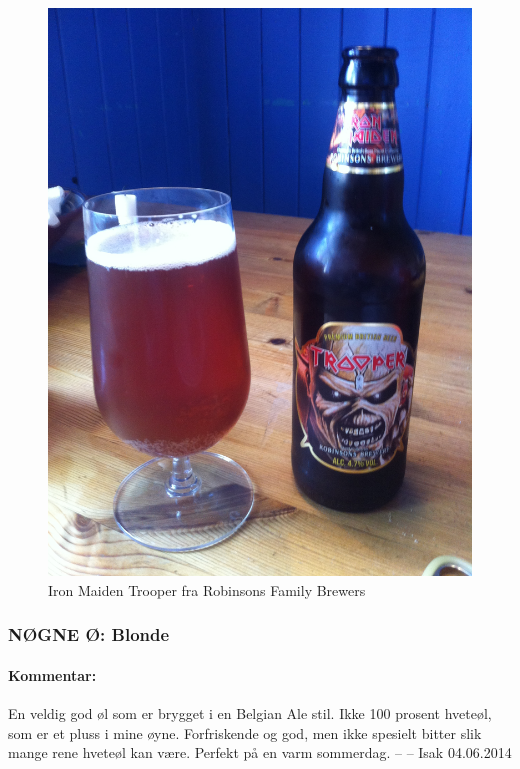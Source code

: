 \documentclass[12pt,a4paper,oneside,norsk]{article}
\begin{document}
\begin{figure} [H]
\centering
\includegraphics[scale=0.1, angle=270]{Bilder/Ol/thetrooper}
\caption{Iron Maiden Trooper fra Robinsons Family Brewers}
\end{figure}

\newpage
\subsubsection{NØGNE Ø: Blonde}
\paragraph{Kommentar:} En veldig god øl som er brygget i en Belgian Ale stil. Ikke 100 prosent hveteøl, som er et pluss i mine øyne. Forfriskende og god, men ikke spesielt bitter slik mange rene hveteøl kan være. Perfekt på en varm sommerdag. 
\newline
-- -- Isak 04.06.2014
\end{document}
